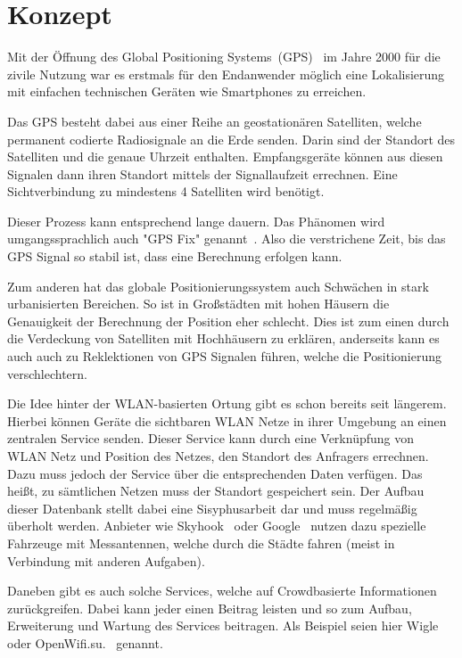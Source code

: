 \documentclass[11pt,a4paper]{article}
\begin{document}
\section{Konzept}

Mit der Öffnung des Global Positioning Systems~(GPS)~\cite{gps} im Jahre 2000 für die zivile Nutzung war es erstmals für den Endanwender möglich eine Lokalisierung mit einfachen technischen Geräten wie Smartphones zu erreichen.

Das GPS besteht dabei aus einer Reihe an geostationären Satelliten, welche permanent codierte Radiosignale an die Erde senden. Darin sind der Standort des Satelliten und die genaue Uhrzeit enthalten. Empfangsgeräte können aus diesen Signalen dann ihren Standort mittels der Signallaufzeit errechnen. Eine Sichtverbindung zu mindestens 4 Satelliten wird benötigt.

Dieser Prozess kann entsprechend lange dauern. Das Phänomen wird umgangssprachlich auch "GPS Fix" genannt~\cite{gpsfix}. Also die verstrichene Zeit, bis das GPS Signal so stabil ist, dass eine Berechnung erfolgen kann. 

Zum anderen hat das globale Positionierungssystem auch Schwächen in stark urbanisierten Bereichen. So ist in Großstädten mit hohen Häusern die Genauigkeit der Berechnung der Position eher schlecht. Dies ist zum einen durch die Verdeckung von Satelliten mit Hochhäusern zu erklären, anderseits kann es auch auch zu Reklektionen von GPS Signalen führen, welche die Positionierung verschlechtern.

Die Idee hinter der WLAN-basierten Ortung gibt es schon bereits seit längerem. Hierbei können Geräte die sichtbaren WLAN Netze in ihrer Umgebung an einen zentralen Service senden. Dieser Service kann durch eine Verknüpfung von WLAN Netz und Position des Netzes, den Standort des Anfragers errechnen. Dazu muss jedoch der Service über die entsprechenden Daten verfügen. Das heißt, zu sämtlichen Netzen muss der Standort gespeichert sein. Der Aufbau dieser Datenbank stellt dabei eine Sisyphusarbeit dar und muss regelmäßig überholt werden. Anbieter wie Skyhook~\cite{skyhook} oder Google~\cite{google_pos} nutzen dazu spezielle Fahrzeuge mit Messantennen, welche durch die Städte fahren (meist in Verbindung mit anderen Aufgaben). 

Daneben gibt es auch solche Services, welche auf Crowdbasierte Informationen zurückgreifen. Dabei kann jeder einen Beitrag leisten und so zum Aufbau, Erweiterung und Wartung des Services beitragen. Als Beispiel seien hier Wigle~\cite{wigle} oder OpenWifi.su.~\cite{openwifi} genannt.
\end{document}
